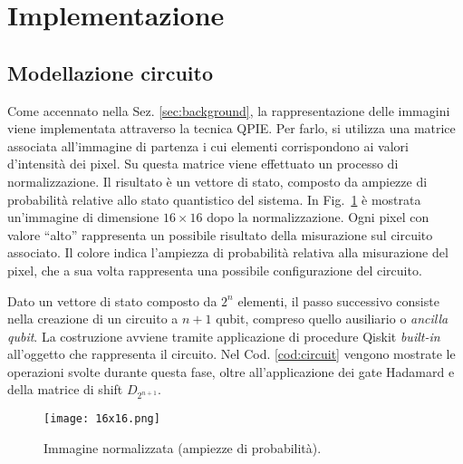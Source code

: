 \section{Implementazione}\label{sec:implementazione}

\subsection{Modellazione circuito}
Come accennato nella Sez. \ref{sec:background}, la rappresentazione 
delle immagini viene implementata attraverso la tecnica QPIE. 
Per farlo, si utilizza una matrice associata all'immagine di partenza
i cui elementi corrispondono ai valori d'intensità dei pixel.
Su questa matrice viene effettuato un processo di normalizzazione.
Il risultato è un vettore di stato, composto da ampiezze di
probabilità relative allo stato quantistico del sistema. In Fig.~\ref{fig:16x16intensity_img} 
è mostrata un'immagine di 
dimensione $16 \times 16$ dopo la normalizzazione. Ogni pixel 
con valore ``alto'' rappresenta un possibile risultato della misurazione sul 
circuito associato. Il colore indica l'ampiezza di probabilità relativa alla 
misurazione del pixel, che a sua volta rappresenta una possibile configurazione 
del circuito.

Dato un vettore di stato composto da $2^n$ elementi, 
il passo successivo consiste nella creazione di un circuito a $n+1$ qubit, 
compreso quello ausiliario o \textit{ancilla qubit}.
La costruzione avviene tramite applicazione di procedure Qiskit \textit{built-in} 
all'oggetto che rappresenta il circuito.
Nel Cod. \ref{cod:circuit} vengono mostrate le operazioni svolte durante
questa fase, oltre all'applicazione dei gate Hadamard e della matrice 
di shift $D_{2^{n+1}}$.

\begin{figure}
    \centering
    \texttt{[image: 16x16.png]}
    \caption{Immagine normalizzata (ampiezze di probabilità).}
    \label{fig:16x16intensity_img}
\end{figure}

